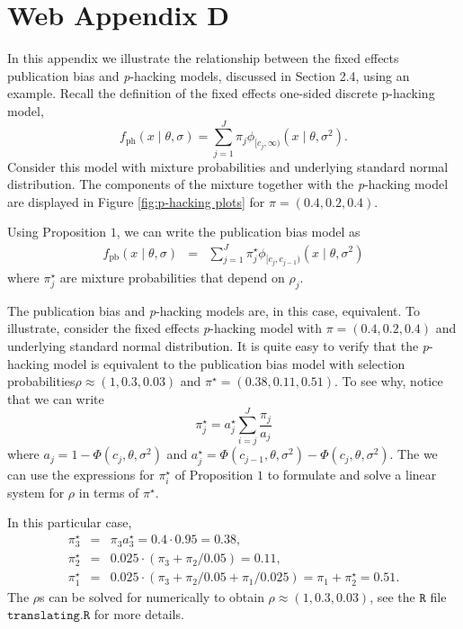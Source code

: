 \section*{Web Appendix D}

In this appendix we illustrate the relationship between the fixed effects publication bias and \emph{p}-hacking models, discussed in Section 2.4, using an example. Recall the definition of the fixed effects one-sided discrete p-hacking model,
\[
f_{\textrm{ph}}(x\mid\theta,\sigma)=\sum_{j=1}^{J}\pi_{j}\phi_{[c_{j},\infty)}(x\mid\theta,\sigma^{2}).
\]
Consider this model with mixture probabilities and underlying standard
normal distribution. The components of the mixture together with the
\emph{p}-hacking model are displayed in Figure \ref{fig:p-hacking plots}
for $\pi=(0.4,0.2,0.4)$.

Using Proposition $1$, we can write the publication bias model as
\begin{eqnarray*}
f_{\textrm{pb}}(x\mid\theta,\sigma) & = & \sum_{j=1}^{J}\pi_{j}^{\star}\phi_{[c_{j},c_{j-1})}(x\mid\theta,\sigma^{2})
\end{eqnarray*}
where $\pi_{j}^{\star}$ are mixture probabilities that depend on
$\rho_{j}$. 

The publication bias and \emph{p}-hacking models are, in this case, equivalent. To illustrate, consider the fixed effects
\emph{p}-hacking model with $\pi=(0.4,0.2,0.4)$ and underlying standard
normal distribution. It is quite easy to verify that the \emph{p}-hacking
model is equivalent to the publication bias model with selection probabilities$\rho\approx(1,0.3,0.03)$
and $\pi^{\star}=(0.38,0.11,0.51)$. To see why, notice that we can
write
\[
\pi_{j}^{\star}=a_{j}^{\star}\sum_{i=j}^{J}\frac{\pi_{j}}{a_{j}}
\]
where $a_{j}=1-\Phi(c_{j},\theta,\sigma^{2})$ and $a_{j}^{\star}=\Phi(c_{j-1},\theta,\sigma^{2})-\Phi(c_{j},\theta,\sigma^{2})$.
The we can use the expressions for $\pi_{i}^{\star}$ of Proposition
$1$ to formulate and solve a linear system for $\rho$ in terms of
$\pi^{\star}$. 

In this particular case,
\begin{eqnarray*}
\pi_{3}^{\star} & = & \pi_{3}a_{3}^{\star}=0.4\cdot0.95=0.38,\\
\pi_{2}^{\star} & = & 0.025\cdot(\pi_{3}+\pi_{2}/0.05)=0.11,\\
\pi_{1}^{\star} & = & 0.025\cdot(\pi_{3}+\pi_{2}/0.05+\pi_{1}/0.025)=\pi_{1}+\pi_{2}^{\star}=0.51.
\end{eqnarray*}
The $\rho$s can be solved for numerically to obtain $\rho\approx(1,0.3,0.03)$,
see the $\mathtt{R}$ file $\texttt{translating.R}$ for more details.

